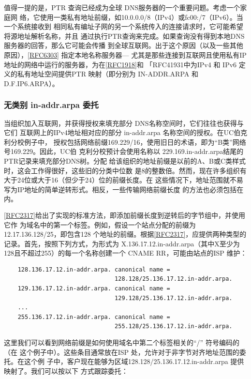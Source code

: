 值得一提的是，PTR 查询已经成为全球 DNS服务器的一个重要问题。考虑一个家庭网
络，它使用一类私有地址前缀，如10.0.0.0/8（IPv4）或fc00:/7（IPv6）。当一个系统接收到
相同私有编址子网的另一个系统传入的连接请求时，它可能希望将源地址解析名称，并且
通过执行PTR查询来完成。如果查询没有得到本地DNS服务器的回答，那么它可能会传播
到全球互联网。出于这个原因（以及一些其他原因），\href{https://www.rfc-editor.org/rfc/rfc6303}{[RFC6303]} 指定本地名称服务器—
尤其是那些连接到互联网且使用私有IP地址的网络中运行的服务器，为在\href{https://www.rfc-editor.org/rfc/rfc1918}{[RFC1918]}和
「RFC41931中为IPv4 和 IPv6 定义的私有地址空间提供PTR 映射（即分别为 IN-ADDR.ARPA
和 D.F.IP6.ARPA）。

\subsubsection{无类别 in-addr.arpa 委托}

当组织加入互联网，并获得授权来填充部分 DNS名称空间时，它们往往也获得与它们
互联网上的IPv4地址相对应的部分 in-addr.arpa 名称空间的授权。在UC伯克利分校例子中，
授权包括网络前缀169.229/16，使用旧日的术语，即为“B类”网络号169.229。因此，UC伯
克利分校预计会使用名称以 229.169.in-addr.arpa结尾的PTR记录来填充部分DNS树。分配
给该组织的地址前缀是以前的A、B或C类样式时，这会工作得很好，这些旧的分类中位数
是8的整数倍。然而，现在许多组织有大于24位或大于16（但少于24）位的前缀长度。在
这些情况下，地址范围就不易写为IP地址的简单逆转形式。相反，一些传输网络前缀长度
的方法也必须包括在内。

\href{https://www.rfc-editor.org/rfc/rfc2317}{[RFC2317]}给出了实现的标准方法，即添加前缀长度到逆转后的字节组中，并使用它作
为域名中的第一个标签。例如，假设一个站点分配的前缀为12.17.136.128/25，即包含128
个地址的前缀。根据\href{https://www.rfc-editor.org/rfc/rfc2317}{[RFC2317]}，应提供两种类型的记录。首先，按照下列方式，为形式为
X.136.17.12.in-addr.arpa（其中X至少为128且不超过255）的每一个名称创建一个 CNAME
RR，可能由站点的ISP 维护：

\begin{verbatim}
    128.136.17.12.in-addr.arpa. canonical name =
                                128.128/25.136.17.12.in-addr.arpa.
    129.136.17.12.in-addr.arpa. canonical name =
                                129.128/25.136.17.12.in-addr.arpa.
    ...
    255.136.17.12.in-addr.arpa. canonical name =
                                255.128/25.136.17.12.in-addr.arpa.
\end{verbatim}

这里我们可以看到网络前缀是如何使用域名中第二个标签相关的“/” 符号编码的（在
这个例子中）。这些条目通常放在ISP 处，允许对于非字节对齐地址范围的委托。在这个例
子中，客户现在能够为区域128.128/25.136.17.12.in-addr.arpa 提供映射了。我们可以按以下
方式跟踪委托：

